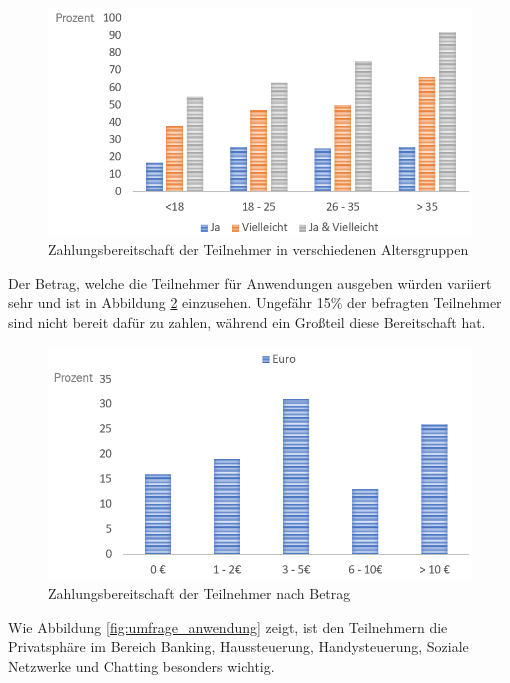 \begin{figure}[!h]
	\centering
	\includegraphics[width=0.9\linewidth]{Picture/umfrage_geld_gruppen}
	\caption[Zahlungsbereitschaft der Teilnehmer in verschiedenen Altersgruppen]{Zahlungsbereitschaft der Teilnehmer in verschiedenen Altersgruppen}
	\label{fig:umfrage_geld_gruppen}
\end{figure}

Der Betrag, welche die Teilnehmer für Anwendungen ausgeben würden variiert sehr und ist in Abbildung \ref{fig:umfrage_betrag} einzusehen. Ungefähr 15\% der befragten Teilnehmer sind nicht bereit dafür zu zahlen, während ein Großteil diese Bereitschaft hat.

\begin{figure}[!h]
	\centering
	\includegraphics[width=0.9\linewidth]{Picture/umfrage_betrag}
	\caption[Zahlungsbereitschaft der Teilnehmer nach Betrag]{Zahlungsbereitschaft der Teilnehmer nach Betrag}
	\label{fig:umfrage_betrag}
\end{figure}

Wie Abbildung \ref{fig:umfrage_anwendung} zeigt, ist den Teilnehmern die Privatsphäre im Bereich Banking, Haussteuerung, Handysteuerung, Soziale Netzwerke und Chatting besonders wichtig.

